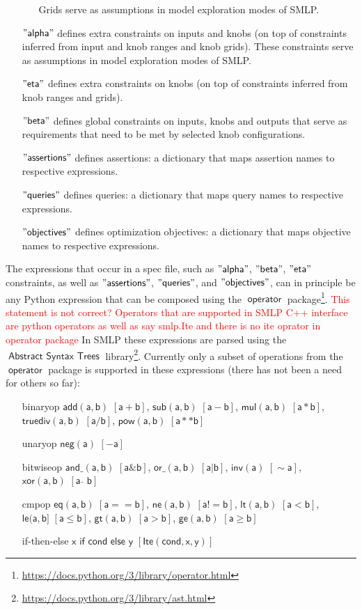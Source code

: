 \documentclass[a4paper,parskip=half]{article} %
\newcommand*\package[1]{\operatorname{\mathsf{#1}}} %
\newcommand*\speckey[1]{\operatorname{\mathsf{"{#1}"}}} %
\newcommand*\operator[1]{\operatorname{\mathsf{{#1}}}} %
\newcommand\todozk[1]{\textcolor{red}{#1}}
\newcommand*\ZK{\todozk}
\begin{document}
\begin{itemize}
\begin{itemize}
Grids serve as assumptions in model exploration modes of SMLP.
\end{itemize}
\item[$\speckey{alpha}$] defines extra constraints on inputs and knobs 
(on top of constraints inferred from input and knob ranges and knob grids).
These constraints serve as assumptions in model exploration modes of SMLP.
\item[$\speckey{eta}$] defines extra constraints on knobs
(on top of constraints inferred from knob ranges and grids).
\item[$\speckey{beta}$] defines global constraints on inputs, knobs and outputs
that serve as requirements that need to be met by selected knob configurations.
\item[$\speckey{assertions}$] defines assertions: a dictionary that maps assertion names to respective expressions. 
\item[$\speckey{queries}$] defines queries: a dictionary that maps query names to respective expressions.
\item[$\speckey{objectives}$] defines optimization objectives: a dictionary that maps objective names to respective expressions.
\end{itemize}


The expressions that occur in a spec file, such as $\speckey{alpha}$, $\speckey{beta}$, $\speckey{eta}$ constraints,
as well as $\speckey{assertions}$, $\speckey{queries}$, and $\speckey{objectives}$, can in principle be any Python expression
that can be composed using the $\package{operator}$ package\footnote{\url{https://docs.python.org/3/library/operator.html}}.
\ZK{This statement is not correct? Operators that are supported in SMLP C++ interface are python operators as well as 
say smlp.Ite and there is no ite oprator in operator package}
In SMLP these expressions are parsed using the 
$\package{Abstract\,\,Syntax\,\,Trees}$ library\footnote{\url{https://docs.python.org/3/library/ast.html}}.
Currently only a subset of operations from the $\package{operator}$ package is supported in these expressions 
(there has not been a need for others so far):
\begin{itemize}
\item[binaryop] $\operator{add(a,b)\,\,[a+b]}$, $\operator{sub(a,b)\,\,[a-b]}$, $\operator{mul(a,b)\,\,[a*b]}$, 
$\operator{truediv(a,b)\,\,[a/b]}$, $\operator{pow(a,b)\,\,[a**b]}$
\item[unaryop] $\operator{neg(a)\,\,[-a]}$
\item[bitwiseop] $\operator{and\_(a,b)\,\,[a\&b]}$, $\operator{or\_(a,b)\,\,[a|b]}$, $\operator{inv(a)\,\,[\sim a]}$, 
$\operator{xor(a,b)\,\,[a\,\,\hat{}\,\,b]}$
\item[cmpop] $\operator{eq(a,b)\,\,[a == b]}$, 
$\operator{ne(a,b)\,\,[a != b]}$, $\operator{lt(a,b)\,\,[a<b]}$, $\operator{le(a,b]\,\,[a\leq b]}$, $\operator{gt(a,b)\,\,[a>b]}$, 
$\operator{ge(a,b)\,\,[a\geq b]}$ 
\item[if-then-else] $\operator{x\,\, if\,\,cond\,\,else\,\, y\,\,[Ite(cond, x, y)]}$
\end{itemize}
\end{document}
